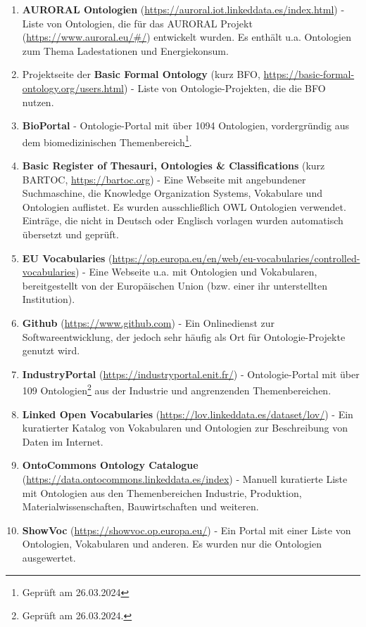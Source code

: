 \documentclass{article}
\begin{document}
\begin{enumerate}
    \item \textbf{AURORAL Ontologien} (\url{https://auroral.iot.linkeddata.es/index.html}) - Liste von Ontologien, die für das AURORAL Projekt (\url{https://www.auroral.eu/#/}) entwickelt wurden. Es enthält u.a. Ontologien zum Thema Ladestationen und Energiekonsum.
    \item Projektseite der \textbf{Basic Formal Ontology} (kurz BFO, \url{https://basic-formal-ontology.org/users.html}) - Liste von Ontologie-Projekten, die die BFO nutzen.
    \item \textbf{BioPortal} - Ontologie-Portal mit über 1094 Ontologien, vordergründig aus dem biomedizinischen Themenbereich\footnote{Geprüft am 26.03.2024}.
    \item \textbf{Basic Register of Thesauri, Ontologies \& Classifications} (kurz BARTOC, \url{https://bartoc.org}) - Eine Webseite mit angebundener Suchmaschine, die Knowledge Organization Systems, Vokabulare und Ontologien auflistet. Es wurden ausschließlich OWL Ontologien verwendet. Einträge, die nicht in Deutsch oder Englisch vorlagen wurden automatisch übersetzt und geprüft.
    \item \textbf{EU Vocabularies} (\url{https://op.europa.eu/en/web/eu-vocabularies/controlled-vocabularies}) - Eine Webseite u.a. mit Ontologien und Vokabularen, bereitgestellt von der Europäischen Union (bzw. einer ihr unterstellten Institution).
    \item \textbf{Github} (\url{https://www.github.com}) - Ein Onlinedienst zur Softwareentwicklung, der jedoch sehr häufig als Ort für Ontologie-Projekte genutzt wird.
    \item \textbf{IndustryPortal} (\url{https://industryportal.enit.fr/}) - Ontologie-Portal mit über 109 Ontologien\footnote{Geprüft am 26.03.2024.} aus der Industrie und angrenzenden Themenbereichen.
    \item \textbf{Linked Open Vocabularies} (\url{https://lov.linkeddata.es/dataset/lov/}) - Ein kuratierter Katalog von Vokabularen und Ontologien zur Beschreibung von Daten im Internet.
    \item \textbf{OntoCommons Ontology Catalogue} (\url{https://data.ontocommons.linkeddata.es/index}) - Manuell kuratierte Liste mit Ontologien aus den Themenbereichen Industrie, Produktion, Materialwissenschaften, Bauwirtschaften und weiteren.
    \item \textbf{ShowVoc} (\url{https://showvoc.op.europa.eu/}) - Ein Portal mit einer Liste von Ontologien, Vokabularen und anderen. Es wurden nur die Ontologien ausgewertet.
\end{enumerate}
\end{document}
